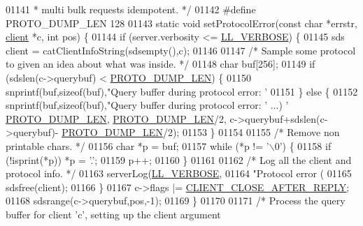 \begin{DoxyCode}
{{{{{{{{{{{01141 \textcolor{comment}{ * multi bulk requests idempotent. */}
01142 \textcolor{preprocessor}{#}\textcolor{preprocessor}{define} \textcolor{preprocessor}{PROTO\_DUMP\_LEN} 128
01143 \textcolor{keyword}{static} \textcolor{keywordtype}{void} setProtocolError(\textcolor{keyword}{const} \textcolor{keywordtype}{char} *errstr, \hyperlink{structclient}{client} *c, \textcolor{keywordtype}{int} pos) \{
01144     \textcolor{keywordflow}{if} (server.verbosity <= \hyperlink{server_8h_a479b60032f8da6d8ad72e1a9d0809950}{LL\_VERBOSE}) \{
01145         sds client = catClientInfoString(sdsempty(),c);
01146 
01147         \textcolor{comment}{/* Sample some protocol to given an idea about what was inside. */}
01148         \textcolor{keywordtype}{char} buf[256];
01149         \textcolor{keywordflow}{if} (sdslen(c->querybuf) < \hyperlink{networking_8c_a2731718953e1ee7483e585b664ae8cb7}{PROTO\_DUMP\_LEN}) \{
01150             snprintf(buf,\textcolor{keyword}{sizeof}(buf),\textcolor{stringliteral}{"Query buffer during protocol error: '%
01151         \} \textcolor{keywordflow}{else} \{
01152             snprintf(buf,\textcolor{keyword}{sizeof}(buf),\textcolor{stringliteral}{"Query buffer during protocol error: '%
       ...) '%
      \hyperlink{networking_8c_a2731718953e1ee7483e585b664ae8cb7}{PROTO\_DUMP\_LEN}, \hyperlink{networking_8c_a2731718953e1ee7483e585b664ae8cb7}{PROTO\_DUMP\_LEN}/2, c->querybuf+sdslen(c->querybuf)-
      \hyperlink{networking_8c_a2731718953e1ee7483e585b664ae8cb7}{PROTO\_DUMP\_LEN}/2);
01153         \}
01154 
01155         \textcolor{comment}{/* Remove non printable chars. */}
01156         \textcolor{keywordtype}{char} *p = buf;
01157         \textcolor{keywordflow}{while} (*p != \textcolor{stringliteral}{'\(\backslash\)0'}) \{
01158             \textcolor{keywordflow}{if} (!isprint(*p)) *p = \textcolor{stringliteral}{'.'};
01159             p++;
01160         \}
01161 
01162         \textcolor{comment}{/* Log all the client and protocol info. */}
01163         serverLog(\hyperlink{server_8h_a479b60032f8da6d8ad72e1a9d0809950}{LL\_VERBOSE},
01164             \textcolor{stringliteral}{"Protocol error (%
01165         sdsfree(client);
01166     \}
01167     c->flags |= \hyperlink{server_8h_a8cff2154afcc2e87ac85bdbbe2814091}{CLIENT\_CLOSE\_AFTER\_REPLY};
01168     sdsrange(c->querybuf,pos,-1);
01169 \}
01170 
01171 \textcolor{comment}{/* Process the query buffer for client 'c', setting up the client argument}
}}}}}}}}}}}}}}
\end{DoxyCode}
